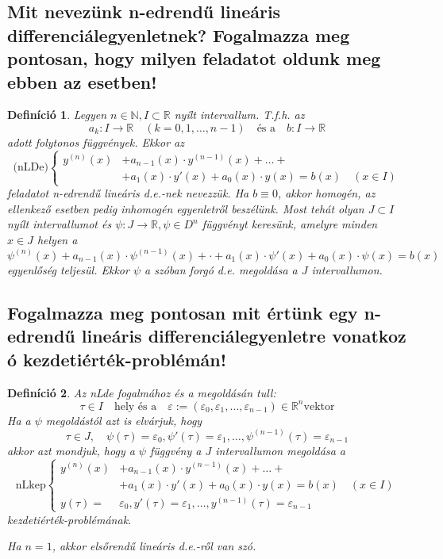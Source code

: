 \documentclass[12pt,a4paper]{article}
\newcommand{\R}{\mathbb{R}}
\newcommand{\N}{\mathbb{N}}
\newcommand{\bb}[1]{\left( #1 \right)}
\newtheorem{defi}{Definíció}[section]
\begin{document}
\subsection{Mit nevezünk n-edrendű lineáris differenciálegyenletnek? Fogalmazza meg pontosan, hogy milyen feladatot oldunk meg ebben az esetben! }
\begin{defi}
Legyen $n \in \N, I \subset \R$ nyílt intervallum. T.f.h. az
\[
a_k : I \to \R \quad \bb{k = 0,1,\ldots,n-1} \quad \text{és a} \quad b : I \to \R
\]
adott folytonos függvények. Ekkor az
\[
\text{(nLDe)}
\begin{cases}
y^{(n)}(x) &+ a_{n-1}(x) \cdot y^{(n-1)}(x) + \ldots + \\
 &+ a_1(x) \cdot y'(x) + a_{0}(x) \cdot y(x) = b(x) \quad \bb{x \in I}
\end{cases}
\]
feladatot n-edrendű lineáris d.e.-nek nevezzük. Ha $b \equiv 0$, akkor homogén, az ellenkező esetben pedig inhomogén egyenletről beszélünk.
Most tehát olyan $J \subset I$ nyílt intervallumot és $\psi : J \to \R, \psi \in D^n$ függvényt keresünk, amelyre minden $x \in J$ helyen a
\[
\psi^{(n)}(x) + a_{n-1}(x) \cdot \psi^{(n-1)}(x) + \cdot + a_1(x) \cdot \psi'(x) + a_0(x) \cdot \psi(x) = b(x)
\]
egyenlőség teljesül. Ekkor $\psi$ a szóban forgó d.e. megoldása a $J$ intervallumon.
\end{defi}
\subsection{Fogalmazza meg pontosan mit értünk egy n-edrendű lineáris differenciálegyenletre vonatkoz ó kezdetiérték-problémán!}
\begin{defi}
Az nLde fogalmához és a megoldásán tull:
\[
\tau \in I \quad \text{hely és a} \quad \varepsilon := \bb{\varepsilon_0,\varepsilon_1,\ldots,\varepsilon_{n-1}} \in \R^n \text{vektor}  
\]
Ha a $\psi$ megoldástól azt is elvárjuk, hogy
\[
\tau \in J, \quad \psi(\tau)= \varepsilon_0, \psi'(\tau) = \varepsilon_1, \ldots , \psi^{(n-1)}(\tau) = \varepsilon_{n-1}
\]
akkor azt mondjuk, hogy a $\psi$ függvény a $J$ intervallumon megoldása a
\[
\text{nLkep} \begin{cases}
y^{(n)}(x) &+ a_{n-1}(x) \cdot y^{(n-1)}(x) + \ldots + \\
 &+ a_1(x) \cdot y'(x) + a_{0}(x) \cdot y(x) = b(x) \quad \bb{x \in I}\\
 y(\tau) = &\varepsilon_0, y'(\tau) = \varepsilon_1, \ldots , y^{(n-1)}(\tau) = \varepsilon_{n-1}  
\end{cases}
\]
kezdetiérték-problémának.

Ha $n = 1$, akkor elsőrendű lineáris d.e.-ről van szó.
\end{defi}
\end{document}
